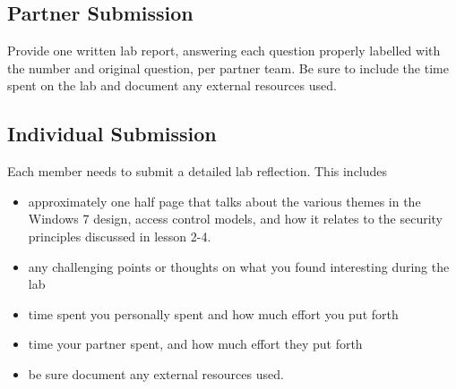 \documentclass{article}
\begin{document}
\subsection{Partner Submission}
Provide one written lab report, answering each question properly labelled with the number and original question, per partner team. Be sure to include the time spent on the lab and document any external resources used. 

\subsection{Individual Submission}
Each member needs to submit a detailed lab reflection. This includes 
\begin{itemize}
\item  approximately one half page that talks about the various themes in the Windows 7 design, access control models, and how it relates to the security principles discussed in lesson 2-4. 
\item any challenging points or thoughts on what you found interesting during the lab 
\item time spent you personally spent and how much effort you put forth
\item time your partner spent, and how much effort they put forth
\item be sure document any external resources used. 
\end{itemize}




\begin{comment}


Rubric  -- thinking about a point a question and 10 points for overall quality.  Use of Wikipedia or stack overflow is an automatic 10\% hit the first time,  10\% more each additional time.  Take off 3 points for organization if bad…
\end{comment}
\end{document}
